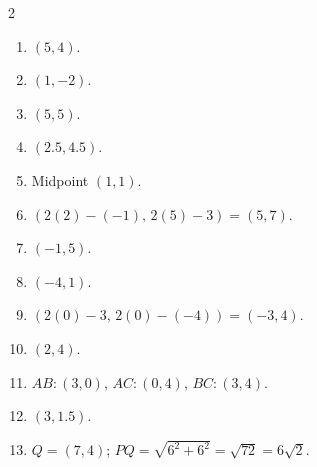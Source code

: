 \documentclass[11pt]{article}
\begin{document}
\begin{keybox}
\begin{multicols}{2}
\small
\begin{enumerate}[leftmargin=*,itemsep=3pt]
  \item $(5,4)$.
  \item $(1,-2)$.
  \item $(5,5)$.
  \item $(2.5,4.5)$.
  \item Midpoint $(1,1)$.
  \item $(2(2)-(-1),\,2(5)-3)=(5,7)$.
  \item $(-1,5)$.
  \item $(-4,1)$.
  \item $(2(0)-3,\,2(0)-(-4))=(-3,4)$.
  \item $\left(2,4\right)$.
  \item $AB:(3,0)$, $AC:(0,4)$, $BC:(3,4)$.
  \item $(3,1.5)$.
  \item $Q=(7,4)$; $PQ=\sqrt{6^2+6^2}=\sqrt{72}=6\sqrt2$.
\end{enumerate}
\end{multicols}
\end{keybox}
\end{document}
